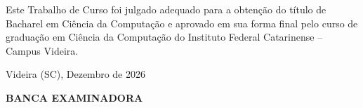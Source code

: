 \begin{folhadeaprovacao}

  \begin{center}
  \vspace*{-1.2cm}
    \textbf{\large\imprimirautor}
    
    \vspace*{\fill}\vspace*{\fill}\vspace*{\fill}
    \parbox{15cm}{
        \OnehalfSpacing\centering\large\textbf{\imprimirtitulo}
    }
    \vspace*{\fill}\vspace*{\fill}
    
    \hspace{.45\textwidth}
    \begin{minipage}{.5\textwidth}
        Este Trabalho de Curso foi julgado
        adequado para a obtenção do título de
        Bacharel em Ciência da Computação e
        aprovado em sua forma final pelo curso de
        graduação em Ciência da Computação do Instituto Federal Catarinense
        – Campus Videira. 

    \end{minipage}%
    \vspace*{\fill}
   \end{center}
    \vspace{-1cm}
  \begin{center}
  	 Videira (SC), Dezembro de 2026
  \end{center}
  


  
   			  
    \begin{center}
  	\textbf{ BANCA EXAMINADORA}
   \end{center}
    

    \vspace*{1cm}
  
\end{folhadeaprovacao}
